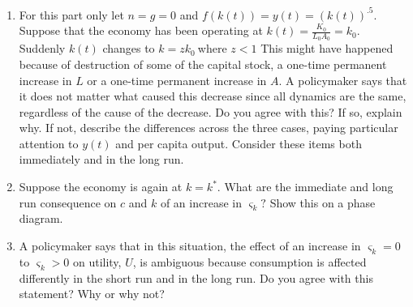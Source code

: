 \documentclass{article}
\begin{document}
\begin{enumerate}
\begin{enumerate}
\item For this part only let $n=g=0$ and $f\left( k\left( t\right) \right)
=y\left( t\right) =\left( k\left( t\right) \right) ^{.5}$. Suppose that the
economy has been operating at $k\left( t\right) =\frac{K_{0}}{L_{0}A_{0}}%
=k_{0}.$ Suddenly $k\left( t\right) $ changes to $k=zk_{0}\ $where $z<1$
This might have happened because of destruction of some of the capital
stock, a one-time permanent increase in $L$ or a one-time permanent increase
in $A$. A policymaker says that it does not matter what caused this decrease
since all dynamics are the same, regardless of the cause of the decrease. Do
you agree with this? If so, explain why. If not, describe the differences
across the three cases, paying particular attention to $y\left( t\right) $
and per capita output. Consider these items both immediately and in the long
run.

\item Suppose the economy is again at $k=k^{\ast }.$ What are the immediate
and long run consequence on $c$ and $k$ of an increase in $\varsigma _{k}?$
Show this on a phase diagram.

\item A policymaker says that in this situation, the effect of an increase
in $\varsigma _{k}=0$ to $\varsigma _{k}>0$ on utility, $U$, is ambiguous
because consumption is affected differently in the short run and in the long
run. Do you agree with this statement? Why or why not?\pagebreak 
\end{enumerate}
\end{enumerate}
\end{document}
